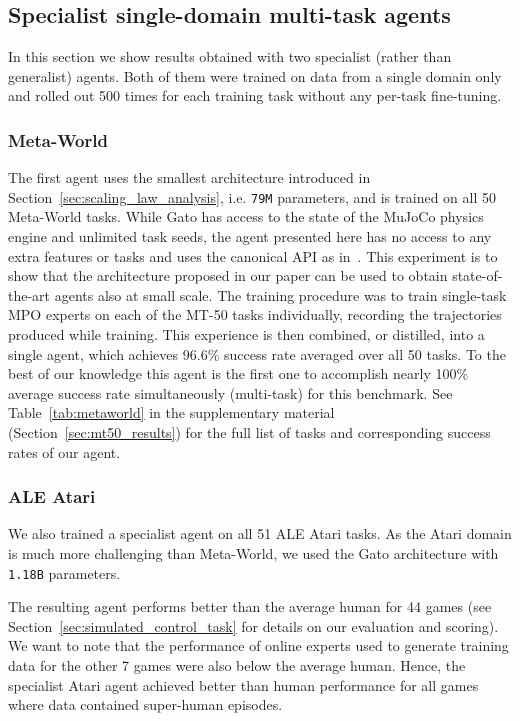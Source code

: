 \documentclass[10pt]{article} \usepackage[accepted]{tmlr}
\newcommand{\model}{{Gato}}
\newcommand{\atari}{{ALE Atari}}
\newcommand{\metaworld}{{Meta-World}}
\begin{document}
\subsection{Specialist single-domain multi-task agents}
\label{sec:specialist_agents}
\vskip 0.2cm
In this section we show results obtained with two specialist (rather than generalist) agents.
Both of them were trained on data from a single domain only and rolled out 500 times for each training task without any per-task fine-tuning.


\subsubsection*{\metaworld}

The first agent uses the smallest architecture introduced in Section~\ref{sec:scaling_law_analysis}, i.e. \texttt{79M} parameters, and is trained on all 50 \metaworld{} tasks.
While \model{} has access to the state of the MuJoCo physics engine and unlimited task seeds, the agent presented here has no access to any extra features or tasks and uses the canonical API as in~\citep{yu2020meta}.
This experiment is to show that the architecture proposed in our paper can be used to obtain state-of-the-art agents also at small scale.
The training procedure was to train single-task MPO \citep{abdolmaleki2018maximum} experts on each of the MT-50 tasks individually, recording the trajectories produced while training.
This experience is then combined, or distilled, into a single agent, which achieves 96.6\% success rate averaged over all 50 tasks.
To the best of our knowledge this agent is the first one to accomplish nearly 100\% average success rate simultaneously (multi-task) for this benchmark.
See Table~\ref{tab:metaworld} in the supplementary material (Section~\ref{sec:mt50_results}) for the full list of tasks and corresponding success rates of our agent.


\subsubsection*{\atari{}}

We also trained a specialist agent on all 51 \atari{} tasks.
As the Atari domain is much more challenging than \metaworld{}, we used the \model{} architecture with \texttt{1.18B} parameters.


The resulting agent performs better than the average human for 44 games (see Section~\ref{sec:simulated_control_task} for details on our evaluation and scoring).
We want to note that the performance of online experts used to generate training data for the other 7 games were also below the average human.
Hence, the specialist Atari agent achieved better than human performance for all games where data contained super-human episodes.
\end{document}
